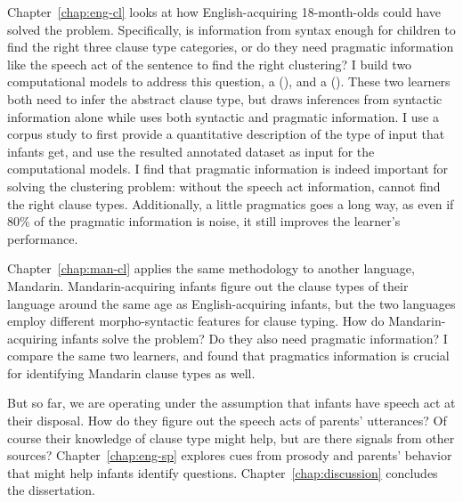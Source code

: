 Chapter~\ref{chap:eng-cl} looks at how English-acquiring 18-month-olds could have solved the problem. Specifically, is information from syntax enough for children to find the right three clause type categories, or do they need pragmatic information like the speech act of the sentence to find the right clustering? I build two computational models to address this question, a \distlearner{} (\dlearnerabbr{}), and a \praglearner{} (\plearnerabbr{}). These two learners both need to infer the abstract clause type, but \dlearnerabbr{} draws inferences from syntactic information alone while \plearnerabbr{} uses both syntactic and pragmatic information. I use a corpus study to first provide a quantitative description of the type of input that infants get, and use the resulted annotated dataset as input for the computational models. I find that pragmatic information is indeed important for solving the clustering problem: without the speech act information, \dlearnerabbr{} cannot find the right clause types. Additionally, a little pragmatics goes a long way, as  even if 80\% of the pragmatic information is noise, it still improves the learner's performance. 

Chapter~\ref{chap:man-cl} applies the same methodology to another language, Mandarin. Mandarin-acquiring infants figure out the clause types of their language around the same age as English-acquiring infants, but the two languages employ different morpho-syntactic features for clause typing. How do Mandarin-acquiring infants solve the problem? Do they also need pragmatic information? I compare the same two learners, and found that pragmatics information is crucial for identifying Mandarin clause types as well.

But so far, we are operating under the assumption that infants have speech act at their disposal. How do they figure out the speech acts of parents' utterances? Of course their knowledge of clause type might help, but are there signals from other sources? Chapter~\ref{chap:eng-sp} explores cues from prosody and parents' behavior that might help infants identify questions. Chapter~\ref{chap:discussion} concludes the dissertation.
 
